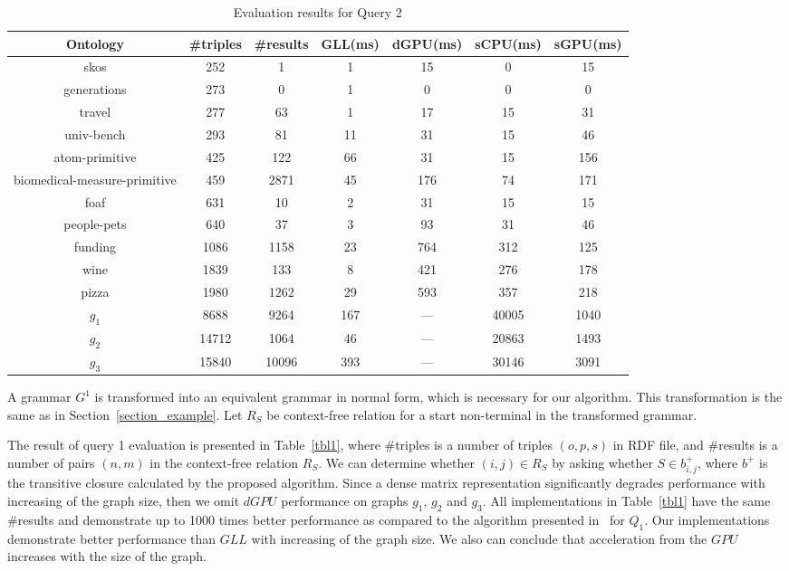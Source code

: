 \begin{table*}[ht]
\centering
\caption{Evaluation results for Query 2}
\label{tbl2}

\begin{tabular}{ | c | c | c | c | c | c | c |}
\hline
Ontology & \#triples & \#results & GLL(ms) & dGPU(ms) & sCPU(ms) & sGPU(ms) \\
\hline 
\hline
skos        & 252 & 1 & 1 & 15 & 0 & 15\\
generations & 273 & 0 & 1 & 0 & 0 & 0\\
travel      & 277 & 63 & 1 & 17 & 15 & 31\\
univ-bench  & 293 & 81 & 11 & 31 & 15 & 46\\
atom-primitive & 425 & 122 & 66 & 31 & 15 & 156\\
biomedical-measure-primitive & 459 & 2871 & 45 & 176 & 74 & 171\\
foaf        & 631 & 10 & 2 & 31 & 15 & 15\\
people-pets & 640 & 37 & 3 & 93 & 31 & 46\\
funding     & 1086 & 1158 & 23 & 764 & 312 & 125\\
wine        & 1839 & 133 & 8 & 421 & 276 & 178\\
pizza       & 1980 & 1262 & 29 & 593 & 357 & 218\\
$g_{1}$     & 8688 & 9264 & 167 & --- & 40005 & 1040\\
$g_{2}$     & 14712 & 1064 & 46 & --- & 20863 & 1493\\
$g_{3}$     & 15840 & 10096 & 393 & --- & 30146 & 3091\\
\hline
\end{tabular}

\end{table*}


A grammar $G^1$ is transformed into an equivalent grammar in normal form, which is necessary for our algorithm. This transformation is the same as in Section~\ref{section_example}. Let $R_S$ be context-free relation for a start non-terminal in the transformed grammar.

The result of query 1 evaluation is presented in Table~\ref{tbl1}, where \#triples is a number of triples $(o,p,s)$ in RDF file, and \#results is a number of pairs $(n,m)$ in the context-free relation $R_S$. We can determine whether $(i,j) \in R_S$ by asking whether $S \in b^+_{i,j}$, where $b^+$ is the transitive closure calculated by the proposed algorithm. Since a dense matrix representation significantly degrades performance with increasing of the graph size, then we omit $dGPU$ performance on graphs $g_1$, $g_2$ and $g_3$. All implementations in Table~\ref{tbl1} have the same \#results and demonstrate up to 1000 times better performance as compared to the algorithm presented in~\cite{RDF} for $Q_1$. Our implementations demonstrate better performance than $GLL$ with increasing of the graph size. We also can conclude that acceleration from the $GPU$ increases with the size of the graph.

